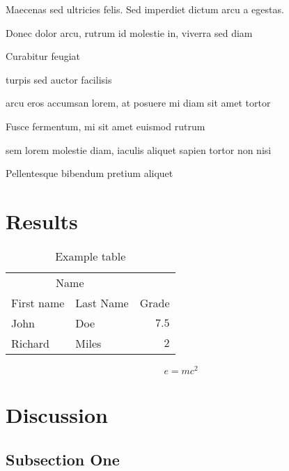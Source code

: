 \documentclass[twoside]{article}
\begin{document}
\begin{multicols}{2}
Maecenas sed ultricies felis. Sed imperdiet dictum arcu a egestas. 
\begin{compactitem}
\item Donec dolor arcu, rutrum id molestie in, viverra sed diam
\item Curabitur feugiat
\item turpis sed auctor facilisis
\item arcu eros accumsan lorem, at posuere mi diam sit amet tortor
\item Fusce fermentum, mi sit amet euismod rutrum
\item sem lorem molestie diam, iaculis aliquet sapien tortor non nisi
\item Pellentesque bibendum pretium aliquet
\end{compactitem}
\lipsum[4] %


\section{Results}

\begin{table}[H]
\caption{Example table}
\centering
\begin{tabular}{llr}
\toprule
\multicolumn{2}{c}{Name} \\
\cmidrule(r){1-2}
First name & Last Name & Grade \\
\midrule
John & Doe & $7.5$ \\
Richard & Miles & $2$ \\
\bottomrule
\end{tabular}
\end{table}

\lipsum[5] %

\begin{equation}
\label{eq:emc}
e = mc^2
\end{equation}

\lipsum[6] %


\section{Discussion}

\subsection{Subsection One}


\end{multicols}
\end{document}

